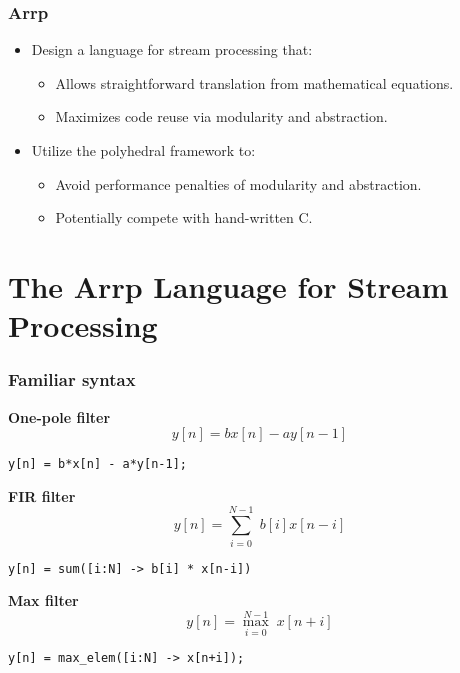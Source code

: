 \documentclass{beamer}
\begin{document}
\begin{frame}
\frametitle{Arrp}

\begin{itemize}
\item Design a language for stream processing that:
\begin{itemize}
  \item Allows straightforward translation from mathematical equations.
  \item Maximizes code reuse via modularity and abstraction.
\end{itemize}
\item Utilize the polyhedral framework to:
\begin{itemize}
  \item Avoid performance penalties of modularity and abstraction.
  \item Potentially compete with hand-written C.
\end{itemize}
\end{itemize}

\end{frame}

\section{The Arrp Language for Stream Processing}

\begin{frame}[fragile]
\frametitle{Familiar syntax}

\textbf{One-pole filter}
\[y[n] = b x[n] - a y[n-1]\]
\begin{center}
\begin{BVerbatim}
y[n] = b*x[n] - a*y[n-1];
\end{BVerbatim}
\end{center}

\textbf{FIR filter}
\[y[n] = \sum_{i = 0}^{N-1} \; b[i] x[n-i]\]
\begin{center}
\begin{BVerbatim}
y[n] = sum([i:N] -> b[i] * x[n-i])
\end{BVerbatim}
\end{center}

\textbf{Max filter}
\[y[n] = \max_{i = 0}^{N-1} \; x[n+i]\]
\begin{center}
\begin{BVerbatim}
y[n] = max_elem([i:N] -> x[n+i]);
\end{BVerbatim}
\end{center}

\end{frame}
\end{document}
